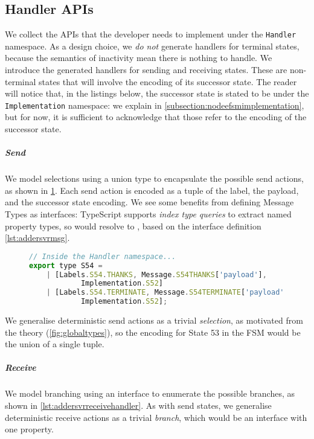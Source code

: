 \subsection{Handler APIs}
\label{subsection:nodeefsmhandlers}

We collect the APIs that the developer needs to implement
under the \texttt{Handler} namespace. 
As a design choice, we \textit{do not} generate handlers for
terminal states, because the semantics of inactivity mean
there is nothing to handle.
We introduce the generated handlers for sending and receiving states.
These are non-terminal states that will involve the encoding of its
successor state. The reader will notice that, in the listings below,
the successor state is stated to be under the
\texttt{Implementation} namespace: we explain in 
\cref{subsection:nodeefsmimplementation}, but for now,
it is sufficient to acknowledge that those refer to the encoding
of the successor state.

\subparagraph{Send}
We model selections using a union type to
encapsulate the possible send actions, as shown in 
\cref{lst:addersvrsendhandler}.
Each send action is encoded as a tuple of
the label, the payload, and the successor state encoding.
We see some benefits from defining Message Types as interfaces:
TypeScript supports \textit{index type queries} to extract
named property types, so
would resolve to \lstonelinejs{[string]},
based on the interface definition \cref{lst:addersvrmsg}.

\begin{figure}[!ht]
\begin{lstlisting}[language=javascript, tabsize=2]
// Inside the Handler namespace...
export type S54 = 
	| [Labels.S54.THANKS, Message.S54THANKS['payload'],
			Implementation.S52] 
	| [Labels.S54.TERMINATE, Message.S54TERMINATE['payload'], 
			Implementation.S52];
\end{lstlisting}
\label{lst:addersvrsendhandler}
\end{figure}

We generalise deterministic send actions as a trivial \textit{selection}, 
as motivated from the theory (\cref{fig:globaltypes}),
so the encoding for State 53 in the  FSM would be
the union of a single tuple.

\subparagraph{Receive}
We model branching using an interface to 
enumerate the possible branches, as shown in
\cref{lst:addersvrreceivehandler}.
As with send states,
we generalise deterministic receive actions as a trivial \textit{branch},
which would be an interface with one property. 

